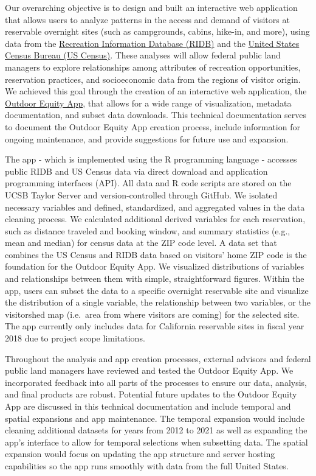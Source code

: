 \documentclass[
  11 pt,
  openany]{book}
\begin{document}
Our overarching objective is to design and built an interactive web application that allows users to analyze patterns in the access and demand of visitors at reservable overnight sites (such as campgrounds, cabins, hike-in, and more), using data from the \href{https://ridb.recreation.gov/landing}{Recreation Information Database (RIDB)} and the \href{https://www.census.gov/data.html}{United States Census Bureau (US Census)}. These analyses will allow federal public land managers to explore relationships among attributes of recreation opportunities, reservation practices, and socioeconomic data from the regions of visitor origin. We achieved this goal through the creation of an interactive web application, the \href{https://shinyapps.bren.ucsb.edu/oe_app/}{Outdoor Equity App}, that allows for a wide range of visualization, metadata documentation, and subset data downloads. This technical documentation serves to document the Outdoor Equity App creation process, include information for ongoing maintenance, and provide suggestions for future use and expansion.

The app - which is implemented using the R programming language - accesses public RIDB and US Census data via direct download and application programming interfaces (API). All data and R code scripts are stored on the UCSB Taylor Server and version-controlled through GitHub. We isolated necessary variables and defined, standardized, and aggregated values in the data cleaning process. We calculated additional derived variables for each reservation, such as distance traveled and booking window, and summary statistics (e.g., mean and median) for census data at the ZIP code level. A data set that combines the US Census and RIDB data based on visitors' home ZIP code is the foundation for the Outdoor Equity App. We visualized distributions of variables and relationships between them with simple, straightforward figures. Within the app, users can subset the data to a specific overnight reservable site and visualize the distribution of a single variable, the relationship between two variables, or the visitorshed map (i.e.~area from where visitors are coming) for the selected site. The app currently only includes data for California reservable sites in fiscal year 2018 due to project scope limitations.

Throughout the analysis and app creation processes, external advisors and federal public land managers have reviewed and tested the Outdoor Equity App. We incorporated feedback into all parts of the processes to ensure our data, analysis, and final products are robust. Potential future updates to the Outdoor Equity App are discussed in this technical documentation and include temporal and spatial expansions and app maintenance. The temporal expansion would include cleaning additional datasets for years from 2012 to 2021 as well as expanding the app's interface to allow for temporal selections when subsetting data. The spatial expansion would focus on updating the app structure and server hosting capabilities so the app runs smoothly with data from the full United States.
\end{document}
